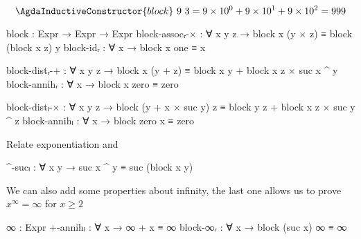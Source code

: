 \[\AgdaInductiveConstructor{block}\ 9\ 3 = 9 \times 10^0 + 9 \times 10^1 + 9 \times 10^2 = 999\]
\begin{code}
    block : Expr → Expr → Expr
    block-assocᵣ-× : ∀ x y z → block x (y × z) ≡ block (block x z) y
    block-idᵣ : ∀ x → block x one ≡ x

    block-distᵣ-+ :
      ∀ x y z → block x (y + z) ≡ block x y + block x z × suc x ^ y
    block-annihᵣ : ∀ x → block x zero ≡ zero

    block-distₗ-× :
      ∀ x y z → block (y + x × suc y) z ≡ block y z + block x z × suc y ^ z
    block-annihₗ : ∀ x → block zero x ≡ zero
\end{code}
Relate exponentiation and 
\begin{code}
    ^-sucₗ : ∀ x y → suc x ^ y ≡ suc (block x y)
\end{code}
We can also add some properties about infinity, the last one allows us to prove $x^\infty = \infty$ for $x \ge 2$
\begin{code}
    ∞ : Expr
    +-annihₗ : ∀ x → ∞ + x ≡ ∞
    block-∞ᵣ : ∀ x → block (suc x) ∞ ≡ ∞
\end{code}

